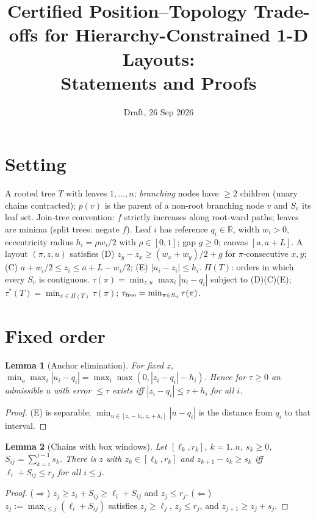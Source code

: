 \documentclass[11pt]{article}
\title{Certified Position--Topology Trade-offs for Hierarchy-Constrained 1-D Layouts:\\ Statements and Proofs}
\date{Draft, 26 Sep 2026}
\newtheorem{lemma}{Lemma}\newtheorem{proposition}{Proposition}\newtheorem{theorem}{Theorem}\newtheorem{corollary}{Corollary}
\theoremstyle{remark}\newtheorem{remark}{Remark}
\begin{document}
\maketitle

\section*{Setting}
A rooted tree $T$ with leaves $1,\dots,n$; \emph{branching} nodes have $\ge 2$ children (unary chains contracted); $p(v)$ is the parent of a non-root branching node $v$ and $S_v$ its leaf set. Join-tree convention: $f$ strictly increases along root-ward paths; leaves are minima (split trees: negate $f$).
Leaf $i$ has reference $q_i\in\mathbb R$, width $w_i>0$, eccentricity radius $h_i=\rho w_i/2$ with $\rho\in[0,1]$; gap $g\ge 0$; canvas $[a,a+L]$.
A layout $(\pi,z,u)$ satisfies
(D) $z_y-z_x\ge (w_x+w_y)/2+g$ for $\pi$-consecutive $x,y$;
(C) $a+w_i/2\le z_i\le a+L-w_i/2$;
(E) $|u_i-z_i|\le h_i$.
$\Pi(T)$: orders in which every $S_v$ is contiguous.
$\tau(\pi)=\min_{z,u}\max_i|u_i-q_i|$ subject to (D)(C)(E); $\tau^*(T)=\min_{\pi\in\Pi(T)}\tau(\pi)$; $\tau_{\rm free}=\min_{\pi\in S_n}\tau(\pi)$.

\section{Fixed order}
\begin{lemma}[Anchor elimination]\label{lem:anchor}
For fixed $z$, $\min_u\max_i|u_i-q_i| = \max_i\max(0,|z_i-q_i|-h_i)$. Hence for $\tau\ge0$ an admissible $u$ with error $\le\tau$ exists iff $|z_i-q_i|\le\tau+h_i$ for all $i$.
\end{lemma}
\begin{proof}(E) is separable; $\min_{u\in[z_i-h_i,z_i+h_i]}|u-q_i|$ is the distance from $q_i$ to that interval.\end{proof}

\begin{lemma}[Chains with box windows]\label{lem:chain}
Let $[\ell_k,r_k]$, $k=1..n$, $s_k\ge0$, $S_{ij}=\sum_{k=i}^{j-1}s_k$. There is $z$ with $z_k\in[\ell_k,r_k]$ and $z_{k+1}-z_k\ge s_k$ iff $\ell_i+S_{ij}\le r_j$ for all $i\le j$.
\end{lemma}
\begin{proof}($\Rightarrow$) $z_j\ge z_i+S_{ij}\ge\ell_i+S_{ij}$ and $z_j\le r_j$. ($\Leftarrow$) $z_j:=\max_{i\le j}(\ell_i+S_{ij})$ satisfies $z_j\ge\ell_j$, $z_j\le r_j$, and $z_{j+1}\ge z_j+s_j$.\end{proof}
\end{document}
